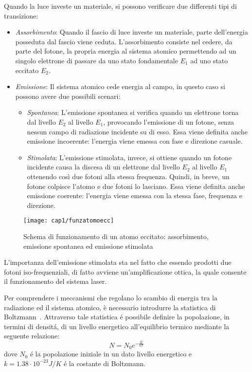 Quando la luce investe un materiale, si possono verificare due differenti tipi di transizione:
\begin{itemize}
	\item \emph{Assorbimento}: Quando il fascio di luce investe un materiale, parte dell'energia posseduta dal fascio viene ceduta. L'assorbimento consiste nel cedere, da parte del fotone, la propria energia al sistema atomico permettendo ad un singolo elettrone di passare da uno stato fondamentale $E_{1}$ ad uno stato eccitato $E_{2}$.
	\item \emph{Emissione}: Il sistema atomico cede energia al campo, in questo caso si possono avere due possibili scenari:
	\begin{itemize}
		\item \emph{Spontanea}: L'emissione spontanea si verifica quando un elettrone torna dal livello $E_{2}$ al livello $E_{1}$, provocando l'emissione di un fotone, senza nessun campo di radiazione incidente su di esso. Essa viene definita anche emissione incoerente: l'energia viene emessa con fase e direzione casuale.
		\item \emph{Stimolata}: L'emissione stimolata, invece, si ottiene quando un fotone incidente causa la discesa di un elettrone dal livello $E_{2}$ al livello $E_{1}$ ottenendo così due fotoni alla stessa frequenza. Quindi, in breve, un fotone colpisce l'atomo e due fotoni lo lasciano. Essa viene definita anche emissione coerente: l'energia viene emessa con la stessa fase, frequenza e direzione.
	\end{itemize} 
\end{itemize}
\begin{figure}[H]
  \begin{center}
    \texttt{[image: cap1/funzatomoecc]}
    \caption{Schema di funzionamento di un atomo eccitato: assorbimento, emissione spontanea ed emissione stimolata}
    \label{funzatomoecc}
  \end{center}
\end{figure}
L'importanza dell'emissione stimolata sta nel fatto che essendo prodotti due fotoni iso-frequenziali, di fatto avviene un'amplificazione ottica, la quale consente il funzionamento del sistema laser.

Per comprendere i meccanismi che regolano lo scambio di energia tra la radiazione ed il sistema atomico, è necessario introdurre la statistica di Boltzmann~\cite{kasap2012optoelectronics}. Attraverso tale statistica \'e possibile definire la popolazione, in termini di densit\'a, di un livello energetico all'equilibrio termico mediante la seguente relazione:
\begin{equation}
  N=N_0e^{{-\frac{E}{kT}}}
\end{equation}
dove $N_0$ \'e la popolazione iniziale in un dato livello energetico e $k= 1.38 \cdot 10^{-23} J / K$ \'e la costante di Boltzmann. %
 
